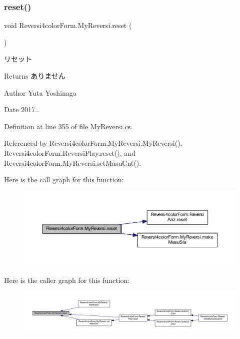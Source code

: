 \subsubsection{\texorpdfstring{reset()}{reset()}}
{\footnotesize\ttfamily void Reversi4color\+Form.\+My\+Reversi.\+reset (\begin{DoxyParamCaption}{ }\end{DoxyParamCaption})}



リセット 

\begin{DoxyReturn}{Returns}
ありません 
\end{DoxyReturn}
\begin{DoxyAuthor}{Author}
Yuta Yoshinaga 
\end{DoxyAuthor}
\begin{DoxyDate}{Date}
2017.. 
\end{DoxyDate}


Definition at line 355 of file My\+Reversi.\+cs.



Referenced by Reversi4color\+Form.\+My\+Reversi.\+My\+Reversi(), Reversi4color\+Form.\+Reversi\+Play.\+reset(), and Reversi4color\+Form.\+My\+Reversi.\+set\+Masu\+Cnt().

Here is the call graph for this function\+:\nopagebreak
\begin{figure}[H]
\begin{center}
\leavevmode
\includegraphics[width=350pt]{class_reversi4color_form_1_1_my_reversi_aeb24b855c540f99c901de08b11af1dd6_cgraph}
\end{center}
\end{figure}
Here is the caller graph for this function\+:\nopagebreak
\begin{figure}[H]
\begin{center}
\leavevmode
\includegraphics[width=350pt]{class_reversi4color_form_1_1_my_reversi_aeb24b855c540f99c901de08b11af1dd6_icgraph}
\end{center}
\end{figure}
\mbox{\label{class_reversi4color_form_1_1_my_reversi_a94536b8feaa37ca51b3d0612befae12f}} 
